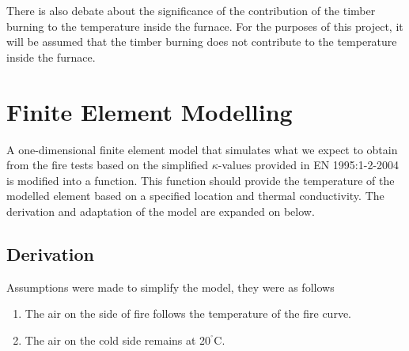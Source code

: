 	There is also debate about the significance of the contribution of the timber burning to the temperature inside the furnace. 
	For the purposes of this project, it will be assumed that the timber burning does not contribute to the temperature inside the furnace.
	
\section{Finite Element Modelling}\label{femexpl}
A one-dimensional finite element model that simulates what we expect to obtain from the fire tests based on the simplified $\kappa$-values provided in EN 1995:1-2-2004 is modified into a function.
This function should provide the temperature of the modelled element based on a specified location and thermal conductivity.
The derivation and adaptation of the model are expanded on below.
	\subsection{Derivation}%
	
	Assumptions were made to simplify the model, they were as follows
	\begin{enumerate}
\item{The air on the side of fire follows the temperature of the fire curve.}
\item{The air on the cold side remains at 20$^{^\circ}$C.}
	\end{enumerate}
